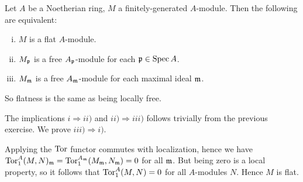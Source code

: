 \documentclass[11pt, english]{article}
\begin{document}
\begin{exc}[Exercise 16]
 Let $A$ be a Noetherian ring, $M$ a finitely-generated $A$-module. Then the following are equivalent:
 \begin{enumerate}[i)]
 \item $M$ is a flat $A$-module.
\item $M_{\mathfrak{p}}$ is a free $A_{\mathfrak{p}}$-module for each $\mathfrak{p} \in \operatorname{Spec} A$.
\item $M_{\mathfrak{m}}$ is a free $A_{\mathfrak{m}}$-module for each maximal ideal $\mathfrak{m}$.
 \end{enumerate}

So flatness is the same as being locally free.
\end{exc}
\begin{sol}
 The implications $i \Rightarrow ii)$ and $ii) \Rightarrow iii)$ follows trivially from the previous exercise. We prove $iii) \Rightarrow i)$. 

Applying the $\operatorname{\mathrm{Tor}}$ functor commutes with localization, hence we have $\operatorname{\mathrm{Tor}}_1^A(M,N)_{\mathfrak{m}} = \operatorname{\mathrm{Tor}}_1^{A_{\mathfrak{m}}}(M_{\mathfrak{m}}, N_{\mathfrak{m}})=0$ for all $\mathfrak{m}$. But being zero is a local property, so it follows that $\operatorname{\mathrm{Tor}}_1^A(M,N)=0$ for all $A$-modules $N$. Hence $M$ is flat.
\end{sol}
\end{document}

